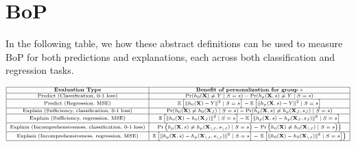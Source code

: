 \section{BoP}\label{sec:emprical_bop}

In the following table, we how these abstract definitions can be used to measure BoP for both predictions and explanations, each across both classification and regression tasks.

\[
\scriptsize
\begin{array}{|c|c|}
\hline
\textbf{Evaluation Type} & \textbf{Benefit of personalization for group $s$} \\
\hline
\text{Predict (Classification, 0-1 loss)} & \Pr(h_0(\mathbf{X}) \neq Y \mid S = s) - \Pr(h_p(\mathbf{X}, s) \neq Y \mid S = s) \\
\hline
\text{Predict (Regression, MSE)} & \mathbb{E}\left[\|h_0(\mathbf{X}) - Y\|^2 \mid S = s \right] - \mathbb{E}\left[\|h_p(\mathbf{X}, s) - Y\|^2 \mid S = s \right] \\
\hline
\text{Explain (Sufficiency, classification, 0-1 loss)} & \Pr(h_0(\mathbf{X}) \neq h_0(\mathbf{X}_J) \mid S = s) - \Pr(h_p(\mathbf{X}, s) \neq h_p(\mathbf{X}_J, s_J) \mid S = s) \\
\hline
\text{Explain (Sufficiency, regression, MSE)} & \mathbb{E}\left[\|h_0(\mathbf{X}) - h_0(\mathbf{X}_J)\|^2 \mid S = s \right] - \mathbb{E}\left[\|h_p(\mathbf{X}, s) - h_p(\mathbf{X}_J, s_J)\|^2 \mid S = s \right] \\
\hline
\text{Explain (Incomprehensiveness, classification, 0-1 loss)} & \operatorname{Pr}\left(h_p(\mathbf{X}, s) \neq h_p(\mathbf{X}_{\backslash J}, s_{\backslash J}) \mid S=s \right) - \left. \operatorname{Pr}\left(h_0(\mathbf{X}) \neq h_0(\mathbf{X}_{\backslash J}) \mid S=s \right) \right) \\
\hline
\text{Explain (Incomprehensiveness, regression, MSE)} & \mathbb{E}\left[
\| h_p(\mathbf{X}, s) - h_p(\mathbf{X}_{\backslash J},s_{\backslash J}) \|^2 \mid S = s \right]- \left. \mathbb{E}\left[
\| h_0(\mathbf{X}) - h_0(\mathbf{X}_{\backslash J}) \|^2 \mid S = s \right] \right)\\
\hline
\end{array}
\]

